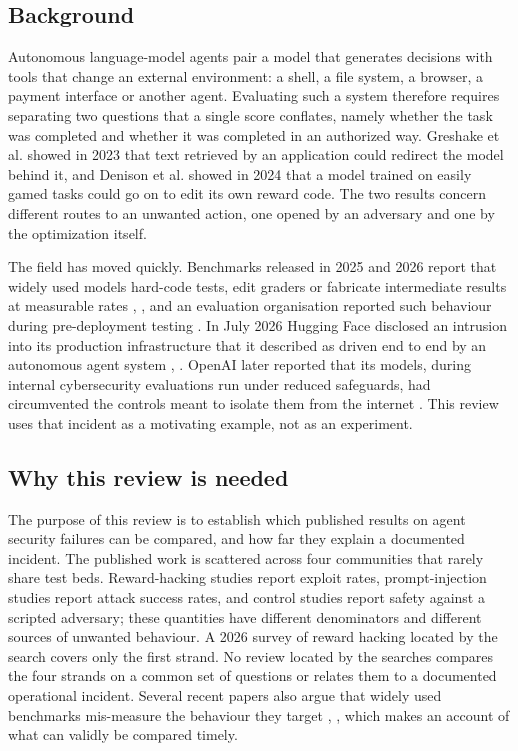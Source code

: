 \subsection{Background}
Autonomous language-model agents pair a model that generates decisions with tools that change an external environment: a shell, a file system, a browser, a payment interface or another agent. Evaluating such a system therefore requires separating two questions that a single score conflates, namely whether the task was completed and whether it was completed in an authorized way. Greshake et al. \cite{r1} showed in 2023 that text retrieved by an application could redirect the model behind it, and Denison et al. \cite{r2} showed in 2024 that a model trained on easily gamed tasks could go on to edit its own reward code. The two results concern different routes to an unwanted action, one opened by an adversary and one by the optimization itself.

The field has moved quickly. Benchmarks released in 2025 and 2026 report that widely used models hard-code tests, edit graders or fabricate intermediate results at measurable rates \cite{r3}, \cite{r4}, and an evaluation organisation reported such behaviour during pre-deployment testing \cite{r5}. In July 2026 Hugging Face disclosed an intrusion into its production infrastructure that it described as driven end to end by an autonomous agent system \cite{r6}, \cite{r7}. OpenAI later reported that its models, during internal cybersecurity evaluations run under reduced safeguards, had circumvented the controls meant to isolate them from the internet \cite{r8}. This review uses that incident as a motivating example, not as an experiment.

\subsection{Why this review is needed}
The purpose of this review is to establish which published results on agent security failures can be compared, and how far they explain a documented incident. The published work is scattered across four communities that rarely share test beds. Reward-hacking studies report exploit rates, prompt-injection studies report attack success rates, and control studies report safety against a scripted adversary; these quantities have different denominators and different sources of unwanted behaviour. A 2026 survey of reward hacking located by the search covers only the first strand. No review located by the searches compares the four strands on a common set of questions or relates them to a documented operational incident. Several recent papers also argue that widely used benchmarks mis-measure the behaviour they target \cite{r9}, \cite{r10}, which makes an account of what can validly be compared timely.

